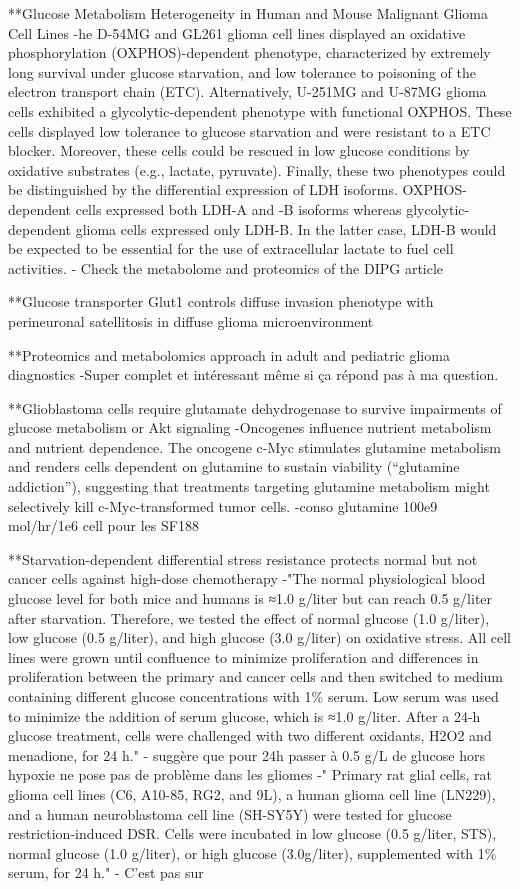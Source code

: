 \documentclass[11pt,a4paper]{article}
\begin{document}
**Glucose Metabolism Heterogeneity in Human and Mouse Malignant Glioma Cell Lines
-he D-54MG and GL261 glioma cell lines displayed an oxidative phosphorylation (OXPHOS)-dependent phenotype, characterized by extremely long survival under glucose starvation, and low tolerance to poisoning of the electron transport chain (ETC). Alternatively, U-251MG and U-87MG glioma cells exhibited a glycolytic-dependent phenotype with functional OXPHOS. These cells displayed low tolerance to glucose starvation and were resistant to a ETC blocker. Moreover, these cells could be rescued in low glucose conditions by oxidative substrates (e.g., lactate, pyruvate). Finally, these two phenotypes could be distinguished by the differential expression of LDH isoforms. OXPHOS-dependent cells expressed both LDH-A and -B isoforms whereas glycolytic-dependent glioma cells expressed only LDH-B. In the latter case, LDH-B would be expected to be essential for the use of extracellular lactate to fuel cell activities. 
- Check the metabolome and proteomics of the DIPG article



**Glucose transporter Glut1 controls diffuse invasion phenotype with perineuronal satellitosis in diffuse glioma microenvironment


**Proteomics and metabolomics approach in adult and pediatric glioma diagnostics 
-Super complet et intéressant même si ça répond pas à ma question.

**Glioblastoma cells require glutamate dehydrogenase to survive impairments of glucose metabolism or Akt signaling
-Oncogenes influence nutrient metabolism and nutrient dependence. The oncogene c-Myc stimulates glutamine metabolism and renders cells dependent on glutamine to sustain viability (“glutamine addiction”), suggesting that treatments targeting glutamine metabolism might selectively kill c-Myc-transformed tumor cells.
-conso glutamine 100e9 mol/hr/1e6 cell pour les SF188

**Starvation-dependent differential stress resistance protects normal but not cancer cells against high-dose chemotherapy
-"The normal physiological blood glucose level for both mice and humans is ≈1.0 g/liter but can reach 0.5 g/liter after starvation. Therefore, we tested the effect of normal glucose (1.0 g/liter), low glucose (0.5 g/liter), and high glucose (3.0 g/liter) on oxidative stress. All cell lines were grown until confluence to minimize proliferation and differences in proliferation between the primary and cancer cells and then switched to medium containing different glucose concentrations with 1\% serum. Low serum was used to minimize the addition of serum glucose, which is ≈1.0 g/liter. After a 24-h glucose treatment, cells were challenged with two different oxidants, H2O2 and menadione, for 24 h."
- suggère que pour 24h passer à 0.5 g/L de glucose hors hypoxie ne pose pas de problème dans les gliomes
-" Primary rat glial cells, rat glioma cell lines (C6, A10-85, RG2, and 9L), a human glioma cell line (LN229), and a human neuroblastoma cell line (SH-SY5Y) were tested for glucose restriction-induced DSR. Cells were incubated in low glucose (0.5 g/liter, STS), normal glucose (1.0 g/liter), or high glucose (3.0g/liter), supplemented with 1\% serum, for 24 h."
- C'est pas sur
\end{document}
